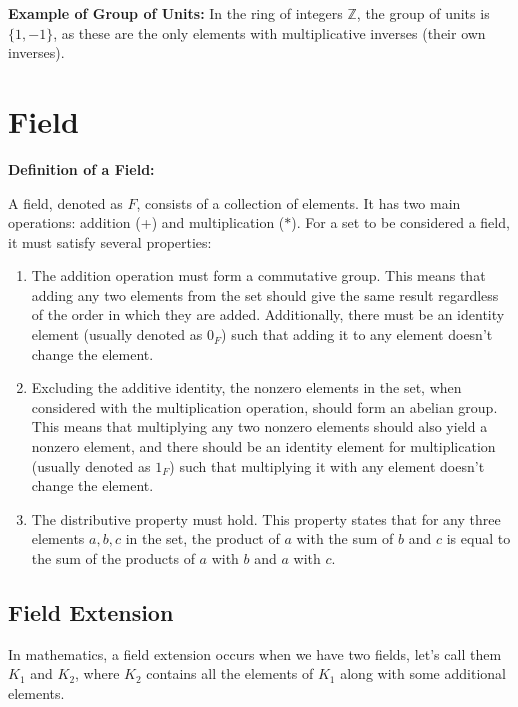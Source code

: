 \documentclass[11pt]{article}
\begin{document}
\textbf{Example of Group of Units:}
In the ring of integers \( \mathbb{Z} \), the group of units is \( \{1, -1\} \), as these are the only elements with multiplicative inverses (their own inverses).


\section{Field}

\textbf{Definition of a Field:}

A field, denoted as \( F \), consists of a collection of elements. It has two main operations: addition (+) and multiplication (\( \ast \)). For a set to be considered a field, it must satisfy several properties:

\begin{enumerate}
    \item The addition operation must form a commutative group. This means that adding any two elements from the set should give the same result regardless of the order in which they are added. Additionally, there must be an identity element (usually denoted as \( 0_F \)) such that adding it to any element doesn't change the element.
    
    \item Excluding the additive identity, the nonzero elements in the set, when considered with the multiplication operation, should form an abelian group. This means that multiplying any two nonzero elements should also yield a nonzero element, and there should be an identity element for multiplication (usually denoted as \( 1_F \)) such that multiplying it with any element doesn't change the element.
    
    \item The distributive property must hold. This property states that for any three elements \( a, b, c \) in the set, the product of \( a \) with the sum of \( b \) and \( c \) is equal to the sum of the products of \( a \) with \( b \) and \( a \) with \( c \).
\end{enumerate}


\subsection{Field Extension}

In mathematics, a field extension occurs when we have two fields, let's call them \( K_1 \) and \( K_2 \), where \( K_2 \) contains all the elements of \( K_1 \) along with some additional elements.
\end{document}
